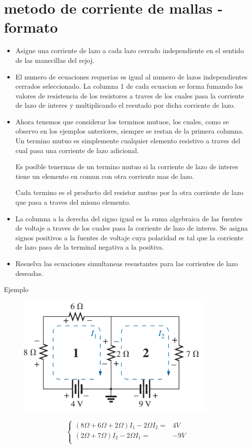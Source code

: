 \section*{metodo de corriente de mallas - formato}
\begin{itemize}
	\justifying
	\item Asigne una corriente de lazo a cada lazo cerrado independiente en el sentido 
	de las manecillas del rejoj.
	\item El numero de ecuaciones requerias es igual al numero de lazos independientes
	cerrados seleccionado. La columna 1 de cada ecuacion se forma fumando los valores de
	resistencia de los resistores a traves de los cuales pasa la corriente de lazo de interes y multiplicando el resutado por dicha corriente de lazo.
	\item Ahora tenemos que considerar los terminos mutuos, los cuales, como se observo en los ejemplos anteriores, siempre se restan de la primera columna. Un termino mutuo es simplemente cualquier elemento resistivo a traves del cual pasa una corriente de lazo adicional.
	
	Es posible tenermas de un termino mutuo si la corriente de lazo de interes tiene un elemento en comun con otra corriente mas de lazo.
	
	Cada termino es el producto del resistor mutuo por la otra corriente de lazo que pasa a traves del mismo elemento.
	\item La columna a la derecha del signo igual es la suma algebraica de las fuentes de voltaje a traves de los cuales pasa la corriente de lazo de interes. Se asigna signos positivos a la fuentes de voltaje cuya polaridad es tal que la corriente de lazo pasa de la terminal negativa a la positiva.
	\item Resuelva las ecuaciones simultaneas resustantes para las corrientes de lazo deseadas.
\end{itemize}
Ejemplo
\begin{figure}[h]
	\centering
	\includegraphics[width=0.4\linewidth]{imagenes/screenshot003}
	\label{fig:screenshot003}
\end{figure}
\[
\left \{
\begin{array}{rr}
	(8 \Omega + 6 \Omega + 2 \Omega) I_1 - 2 \Omega I_2  =& 4 V \\
	(2 \Omega + 7 \Omega) I_2 - 2\Omega I_1 =& -9 V \\
\end{array}
\right .
\]
